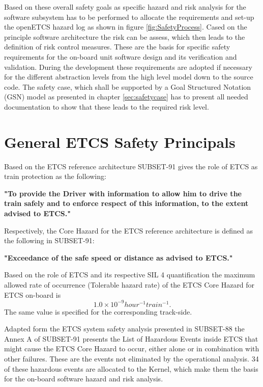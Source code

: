 \documentclass{template/openetcs_report}
\begin{document}
Based on these overall safety goals as specific hazard and risk analysis for the software subsystem has to be performed to allocate the requirements and set-up the openETCS hazard log as shown in figure \ref{fig:SafetyProcess}. Cased on the principle software architecture the risk can be assess, which then leads to the definition of risk control measures. These are the basis for specific safety requirements for the on-board unit software design and its verification and validation. During the development these requirements are adopted if necessary for the different abstraction levels from the high level model down to the source code. The safety case, which shall be supported by a Goal Structured Notation (GSN) \cite{GSNwebsite} model as presented in chapter \ref{sec:safetycase} has to present all needed documentation to show that these leads to the required risk level.

\section{General ETCS Safety Principals}
\label{sec:ETCS-safety}

Based on the ETCS reference architecture SUBSET-91 gives the role of ETCS as train protection as the following:

\begin{center}
\textbf{"To provide the Driver with information to allow  him to drive the train safely and to enforce respect of this information, to the extent advised to ETCS."}
\end{center}

Respectively, the Core Hazard for the ETCS reference architecture is defined as the following in SUBSET-91:
\begin{center}
\textbf{"Exceedance of the safe speed or distance as advised to ETCS."}
\end{center}

Based on the role of ETCS and its respective SIL 4 quantification the maximum allowed rate of occurrence (Tolerable hazard rate) of the ETCS Core Hazard for ETCS on-board is
\[1.0\times10^{-9} hour^{-1} train^{-1}.\]
The same value is specified for the corresponding track-side.

Adapted form the ETCS system safety analysis presented in SUBSET-88 the Annex A of SUBSET-91 presents the List of Hazardous Events inside ETCS that might cause the ETCS Core Hazard to occur, either alone or in combination with other failures. These are the events not eliminated by the operational analysis. 34 of these hazardous events are allocated to the Kernel, which make them the basis for the on-board software hazard and risk analysis. 
\end{document}
